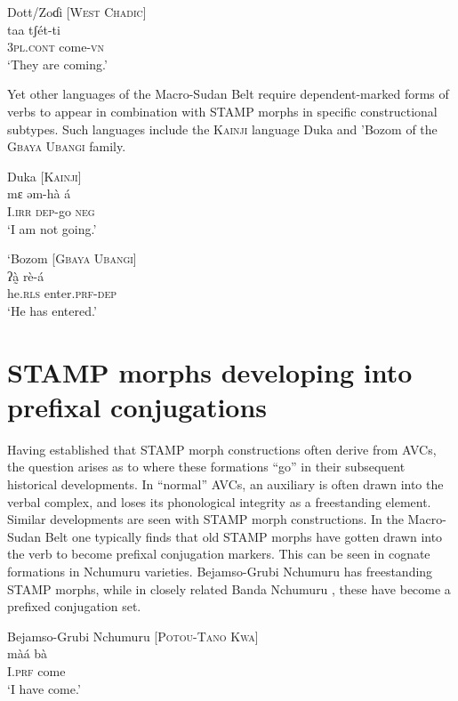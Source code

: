\documentclass[output=paper]{langsci/langscibook}
\begin{document}
\ea\label{ex:anderson:36}
Dott/Zoɗi \citep[165]{Caron2002}            [W\textsc{est} \textsc{Chadic}]\\
\gll taa    tʃét-ti\\
\textsc{3pl.cont}  come-\textsc{vn}\\
\glt `They are coming.'
\z

Yet other languages of the Macro-Sudan Belt require dependent-marked forms of verbs to appear in combination with STAMP morphs in specific constructional subtypes. Such languages include the \textsc{Kainji} language Duka  and 'Bozom  of the \textsc{Gbaya Ubangi} family. 

\ea\label{ex:anderson:37}
Duka  \citep[96-98; 105]{BendorSamuelEtAl1973}     \textsc{[Kainji]}\\
\gll mɛ     əm-hà     á\\
I.\textsc{irr}  \textsc{dep}-go   \textsc{neg}  \\
\glt `I am not going.' 
\z

\ea\label{ex:anderson:38}
`Bozom \citep[159]{Monino1995}            \textsc{[Gbaya Ubangi]}\\
\gll ʔà̰    rè-á      \\
he.\textsc{rls}  enter.\textsc{prf}-\textsc{dep} \\
\glt `He has entered.'
\z

\section{STAMP morphs developing into prefixal conjugations}\label{sec:Anderson:6}


Having established that STAMP morph constructions often derive from AVCs, the question arises as to where these formations ``go'' in their subsequent historical developments. In ``normal'' AVCs, an auxiliary is often drawn into the verbal complex, and loses its phonological integrity as a freestanding element. Similar developments are seen with STAMP morph constructions. In the Macro-Sudan Belt one typically finds that old STAMP morphs have gotten drawn into the verb to become prefixal conjugation markers. This can be seen in cognate formations in Nchumuru varieties. Bejamso-Grubi Nchumuru  has freestanding STAMP morphs, while in closely related Banda Nchumuru , these have become a prefixed conjugation set.

\ea\label{ex:anderson:39}
Bejamso-Grubi Nchumuru  \citep[Nchumuru 5]{Price1975}   [\textsc{Potou-Tano} K\textsc{wa}]\\
\gll màá  bà\\
I.\textsc{prf}  come\\
\glt `I have come.'
\z
\end{document}
